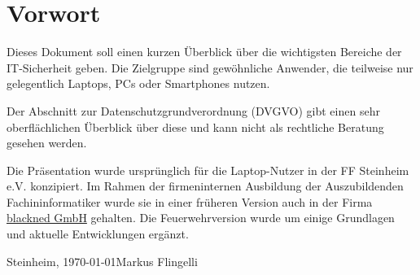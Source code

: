 \section*{Vorwort}
Dieses Dokument soll einen kurzen Überblick über die wichtigsten Bereiche der IT-Sicherheit geben. Die Zielgruppe sind gewöhnliche Anwender, die teilweise nur gelegentlich  Laptops, PCs oder Smartphones nutzen.
\vspace{12pt}

Der Abschnitt zur Datenschutzgrundverordnung (DVGVO) gibt einen sehr oberflächlichen Überblick über diese und kann nicht als rechtliche Beratung gesehen werden.
\vspace{12pt}

Die Präsentation wurde ursprünglich für die Laptop-Nutzer in der FF Steinheim e.V. konzipiert. Im Rahmen der firmeninternen Ausbildung der Auszubildenden Fachininformatiker wurde sie in einer früheren Version auch in der Firma \href{https://www.blackned.de}{blackned GmbH} gehalten. Die Feuerwehrversion wurde um einige Grundlagen und aktuelle Entwicklungen ergänzt.
\vspace{24pt}

Steinheim, \today \hfill Markus Flingelli
\newpage